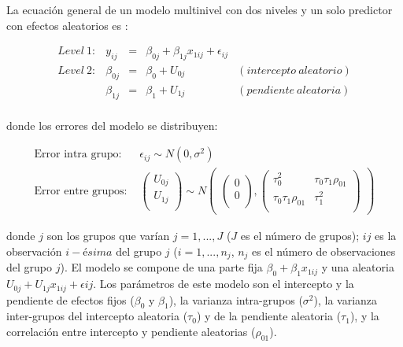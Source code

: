 \documentclass[
  12pt,
  a4paper,
  extrafontsizes,
  onecolumn,
  openright]{memoir}
\begin{document}
La ecuación general de un modelo multinivel con dos niveles y un solo
predictor con efectos aleatorios es \autocite[ver][pp.~40]{chen2021}:

\[
\begin{aligned}
Level\ 1: & y_{ij}     & = & \beta_{0j} + \beta_{1j}x_{1ij} + \epsilon_{ij} \\
Level\ 2: & \beta_{0j} & = & \beta_{0} + U_{0j} & (intercepto\ aleatorio) \\
          & \beta_{1j} & = & \beta_{1} + U_{1j} & (pendiente\ aleatoria) \\
\end{aligned}
\]

donde los errores del modelo se distribuyen:

\[
\begin{aligned}
\text{Error intra grupo: } &  \epsilon_{ij} \sim N(0, \sigma^2) \\
\text{Error entre grupos: } &
\begin{pmatrix}
     U_{0j} \\
     U_{1j} \\
\end{pmatrix} 
\sim
N
\begin{pmatrix}
\begin{pmatrix}
     0 \\
     0 \\
\end{pmatrix},
\begin{pmatrix}
     \tau_0^2 & \tau_0\tau_1\rho_{01} \\
     \tau_0\tau_1\rho_{01} &  \tau_1^2 \\
\end{pmatrix}
\end{pmatrix} 
\end{aligned}
\]

donde \(j\) son los grupos que varían \(j = 1,...,J\) (\(J\) es el
número de grupos); \(ij\) es la observación \(i-ésima\) del grupo \(j\)
(\(i = 1,...,n_j\), \(n_j\) es el número de observaciones del grupo
\(j\)). El modelo se compone de una parte fija
\(\beta_0 + \beta_1 x_{1ij}\) y una aleatoria
\(U_{0j} + U_{1j} x_{1ij} + \epsilon{ij}\). Los parámetros de este
modelo son el intercepto y la pendiente de efectos fijos (\(\beta_0\) y
\(\beta_1\)), la varianza intra-grupos (\(\sigma^2\)), la varianza
inter-grupos del intercepto aleatoria (\(\tau_0\)) y de la pendiente
aleatoria (\(\tau_1\)), y la correlación entre intercepto y pendiente
aleatorias (\(\rho_{01}\)).
\end{document}
